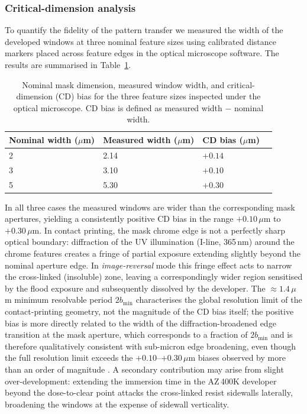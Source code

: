 \subsubsection*{Critical-dimension analysis}

To quantify the fidelity of the pattern transfer we measured the width of the
developed windows at three nominal feature sizes using calibrated
distance markers
placed across feature edges in the optical microscope software. The results are
summarised in Table~\ref{tab:cd_bias}.

\begin{table}[H]
  \centering
  \begin{tabular}{llll}
    \toprule
    \textbf{\boldmath Nominal width ($\mu$m)}
    & \textbf{\boldmath Measured width ($\mu$m)}
    & \textbf{\boldmath CD bias ($\mu$m)} \\
    \midrule
    2 & 2.14 & $+0.14$ \\
    3 & 3.10 & $+0.10$ \\
    5 & 5.30 & $+0.30$ \\
    \bottomrule
  \end{tabular}
  \caption{Nominal mask dimension, measured window width, and critical-dimension
    (CD) bias for the three feature sizes inspected under the optical
  microscope. CD bias is defined as measured width $-$ nominal width.}
  \label{tab:cd_bias}
\end{table}

In all three cases the measured windows are wider than the corresponding mask
apertures, yielding a consistently positive CD bias in the range
$+0.10$\,$\mu$m to $+0.30$\,$\mu$m. In contact printing, the mask chrome edge is
not a perfectly sharp optical boundary: diffraction of the UV illumination
(I-line, 365\,nm) around the chrome features creates a fringe of
partial exposure
extending slightly beyond the nominal aperture edge. In
\emph{image-reversal} mode
this fringe effect acts to narrow the cross-linked (insoluble) zone, leaving a
correspondingly wider region sensitised by the flood exposure and subsequently
dissolved by the developer. The ${\approx}1.4\,\mu$m minimum
resolvable period $2b_\mathrm{min}$ characterises the global
resolution limit of the contact-printing geometry, not the magnitude
of the CD bias itself; the positive bias is more directly related to
the width of the diffraction-broadened edge transition at the mask
aperture, which corresponds to a fraction of $2b_\mathrm{min}$ and is
therefore qualitatively consistent with sub-micron edge broadening,
even though the full resolution limit exceeds the
$+0.10$--$+0.30$\,$\mu$m biases observed by more than an order of
magnitude \cite{FundTechProc2024}. A secondary contribution may
arise from slight over-development: extending the immersion time in the AZ\,400K
developer beyond the dose-to-clear point attacks the cross-linked
resist sidewalls
laterally, broadening the windows at the expense of sidewall verticality.

